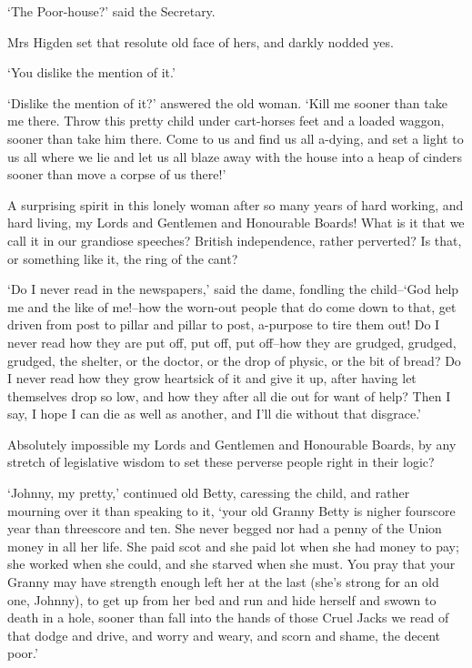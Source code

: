 ‘The Poor-house?’ said the Secretary.

Mrs Higden set that resolute old face of hers, and darkly nodded yes.

‘You dislike the mention of it.’

‘Dislike the mention of it?’ answered the old woman. ‘Kill me sooner
than take me there. Throw this pretty child under cart-horses feet and
a loaded waggon, sooner than take him there. Come to us and find us all
a-dying, and set a light to us all where we lie and let us all blaze
away with the house into a heap of cinders sooner than move a corpse of
us there!’

A surprising spirit in this lonely woman after so many years of hard
working, and hard living, my Lords and Gentlemen and Honourable
Boards! What is it that we call it in our grandiose speeches? British
independence, rather perverted? Is that, or something like it, the ring
of the cant?

‘Do I never read in the newspapers,’ said the dame, fondling the
child--‘God help me and the like of me!--how the worn-out people that
do come down to that, get driven from post to pillar and pillar to post,
a-purpose to tire them out! Do I never read how they are put off, put
off, put off--how they are grudged, grudged, grudged, the shelter, or
the doctor, or the drop of physic, or the bit of bread? Do I never
read how they grow heartsick of it and give it up, after having let
themselves drop so low, and how they after all die out for want of help?
Then I say, I hope I can die as well as another, and I’ll die without
that disgrace.’

Absolutely impossible my Lords and Gentlemen and Honourable Boards, by
any stretch of legislative wisdom to set these perverse people right in
their logic?

‘Johnny, my pretty,’ continued old Betty, caressing the child, and
rather mourning over it than speaking to it, ‘your old Granny Betty is
nigher fourscore year than threescore and ten. She never begged nor had
a penny of the Union money in all her life. She paid scot and she
paid lot when she had money to pay; she worked when she could, and
she starved when she must. You pray that your Granny may have strength
enough left her at the last (she’s strong for an old one, Johnny), to
get up from her bed and run and hide herself and swown to death in a
hole, sooner than fall into the hands of those Cruel Jacks we read of
that dodge and drive, and worry and weary, and scorn and shame, the
decent poor.’

